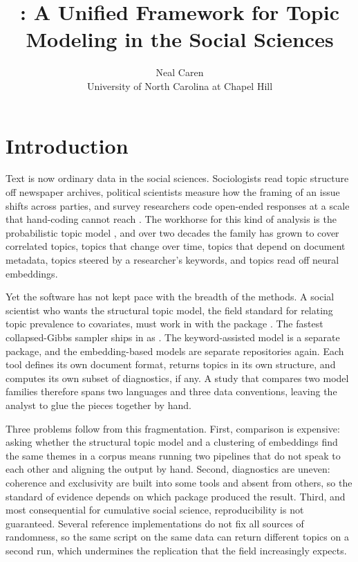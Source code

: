 \documentclass[article,nojss]{jss}
\author{Neal Caren\\University of North Carolina at Chapel Hill}
\title{\pkg{topica}: A Unified \proglang{Python} Framework for Topic Modeling
in the Social Sciences}
\begin{document}
\section{Introduction}\label{sec:intro}

Text is now ordinary data in the social sciences. Sociologists read topic
structure off newspaper archives, political scientists measure how the framing
of an issue shifts across parties, and survey researchers code open-ended
responses at a scale that hand-coding cannot reach \citep{dimaggio2013exploiting,
grimmer2013text, roberts2014structural, gentzkow2019text, grimmer2022text}. The
workhorse for this kind of analysis is the probabilistic topic model
\citep{blei2003lda, blei2012probabilistic}, and over two decades the family has
grown to cover correlated topics, topics that change over time, topics that
depend on document metadata, topics steered by a researcher's keywords, and
topics read off neural embeddings.

Yet the software has not kept pace with the breadth of the methods. A social
scientist who wants the structural topic model, the field standard for relating
topic prevalence to covariates, must work in  with the 
package \citep{roberts2016model, roberts2019stm}. The fastest collapsed-Gibbs
sampler ships in  as  \citep{mccallum2002mallet}. The
keyword-assisted model \citep{eshima2024keyatm} is a separate 
package, and the embedding-based models \citep{grootendorst2022bertopic,
angelov2020top2vec} are separate  repositories again. Each tool
defines its own document format, returns topics in its own structure, and
computes its own subset of diagnostics, if any. A study that compares two model
families therefore spans two languages and three data conventions, leaving the
analyst to glue the pieces together by hand.

Three problems follow from this fragmentation. First, comparison is expensive:
asking whether the structural topic model and a clustering of embeddings find
the same themes in a corpus means running two pipelines that do not speak to each
other and aligning the output by hand. Second, diagnostics are uneven: coherence
and exclusivity are built into some tools and absent from others, so the standard
of evidence depends on which package produced the result. Third, and
most consequential for cumulative social science, reproducibility is not
guaranteed. Several reference implementations do not fix all sources of
randomness, so the same script on the same data can return different topics on a
second run, which undermines the replication that the field increasingly
expects.
\end{document}
